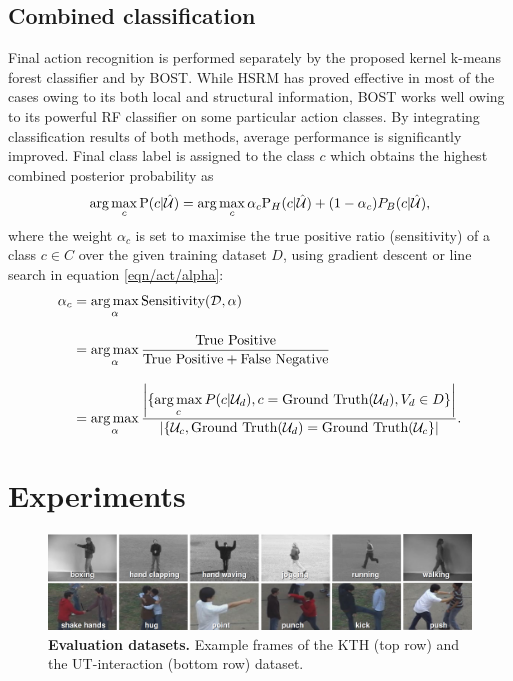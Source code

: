 \subsection{Combined classification} 
Final action recognition is performed separately by the proposed kernel k-means forest classifier and by BOST. While HSRM has proved effective in most of the cases owing to its both local and structural information, BOST works well owing to its powerful RF classifier on some particular action classes. By integrating classification results of both methods, average performance is significantly improved. Final class label is assigned to the class $c$ which obtains the highest combined posterior probability as
\begin{equation}
	\arg\max_{c}
	\mathrm{P}(c|\mathcal{\hat{U}}) = 
	\arg\max_{c}
	\alpha_c \mathrm{P}_{H}(c|\mathcal{\hat{U}}) + (1 - \alpha_c) P_{B}(c|\mathcal{\hat{U}}),
	\label{eqn/act/combine}
\end{equation}
where the weight $\alpha_c$ is set to maximise the true positive ratio (sensitivity) of a class $c \in C$ over the given training dataset $D$, using gradient descent or line search in equation \ref{eqn/act/alpha}:
\begin{equation}
\begin{aligned}
	\alpha_c & = \displaystyle\operatorname*{arg\,max}_{\alpha}\mbox{Sensitivity}(\mathcal{D},\alpha) \\[3mm]
	& = \displaystyle\operatorname*{arg\,max}_{\alpha}\displaystyle\frac{\mbox{True Positive}}{\mbox{True Positive} + \mbox{False Negative}} \\[3mm]
&= \displaystyle\operatorname*{arg\,max}_{\alpha}\displaystyle\frac{\left|\{\displaystyle\operatorname*{arg\,max}_{c}P(c|\mathcal{U}_d),c=\mbox{Ground Truth}(\mathcal{U}_d),V_d \in D\}\right|}{\left|\{\mathcal{U}_c, \mbox{Ground Truth}(\mathcal{U}_d) = \mbox{Ground Truth}(\mathcal{U}_c\}\right|}.
\end{aligned}
\label{eqn/act/alpha}
\end{equation}

\section{Experiments}
\label{sec/act/experiments}

\begin{figure}[th]
	\centering
	\includegraphics[width=1\linewidth]{fig/act/frames.png}
	\caption{\textbf{Evaluation datasets.} Example frames of the KTH (top row) and the UT-interaction (bottom row) dataset.}
	\label{fig/act/frames}
\end{figure}

